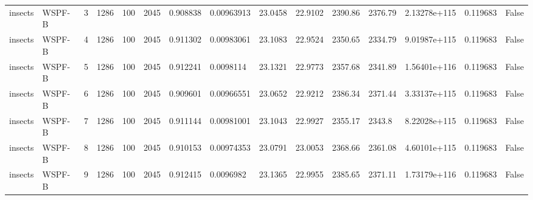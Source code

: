 \begin{tabular}{lllllllllllllll}
insects & WSPF-B & 3 & 1286 & 100 & 2045 & 0.908838 & 0.00963913 & 23.0458 & 22.9102 & 2390.86 & 2376.79 & 2.13278e+115 & 0.119683 & False \\
insects & WSPF-B & 4 & 1286 & 100 & 2045 & 0.911302 & 0.00983061 & 23.1083 & 22.9524 & 2350.65 & 2334.79 & 9.01987e+115 & 0.119683 & False \\
insects & WSPF-B & 5 & 1286 & 100 & 2045 & 0.912241 & 0.0098114 & 23.1321 & 22.9773 & 2357.68 & 2341.89 & 1.56401e+116 & 0.119683 & False \\
insects & WSPF-B & 6 & 1286 & 100 & 2045 & 0.909601 & 0.00966551 & 23.0652 & 22.9212 & 2386.34 & 2371.44 & 3.33137e+115 & 0.119683 & False \\
insects & WSPF-B & 7 & 1286 & 100 & 2045 & 0.911144 & 0.00981001 & 23.1043 & 22.9927 & 2355.17 & 2343.8 & 8.22028e+115 & 0.119683 & False \\
insects & WSPF-B & 8 & 1286 & 100 & 2045 & 0.910153 & 0.00974353 & 23.0791 & 23.0053 & 2368.66 & 2361.08 & 4.60101e+115 & 0.119683 & False \\
insects & WSPF-B & 9 & 1286 & 100 & 2045 & 0.912415 & 0.0096982 & 23.1365 & 22.9955 & 2385.65 & 2371.11 & 1.73179e+116 & 0.119683 & False \\
\hline
\end{tabular}

